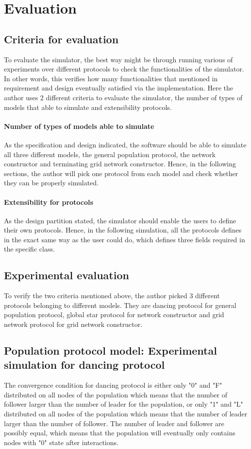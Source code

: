 \section{Evaluation}
\subsection{Criteria for evaluation}
To evaluate the simulator, the best way might be through running various of experiments over different
protocols to check the functionalities of the simulator. In other words, this verifies how many functionalities that
mentioned in requirement and design eventually satisfied via the implementation.
Here the author uses 2 different criteria to evaluate the simulator, the number of types of models that
able to simulate and extensibility protocols.

\paragraph{Number of types of models able to simulate}
As the specification and design indicated, the software should be able to simulate all three different
models, the general population protocol, the network constructor and terminating grid network constructor.
Hence, in the following sections, the author will pick one protocol from each model and check whether they
can be properly simulated.

\paragraph{Extensibility for protocols}
As the design partition stated, the simulator should enable the users to define their own protocols. Hence, in the
following simulation, all the protocols defines in the exact same way as the user could do, which defines three fields
required in the specific class.

\subsection{Experimental evaluation}
To verify the two criteria mentioned above, the author picked 3 different protocols belonging to
different models. They are dancing protocol for general population protocol, global star protocol for
network constructor and grid network protocol for grid network constructor.
\subsection{Population protocol model: Experimental simulation for dancing protocol}
The convergence condition for dancing protocol is either only "0" and "F" distributed on
all nodes of the population which means that the number of follower larger than the number of leader for the
population, or only "1" and "L" distributed on all nodes of the population which means that the number
of leader larger than the number of follower. The number of leader and follower are possibly
equal, which means that the population will eventually only contains nodes with "0" state after interactions.

